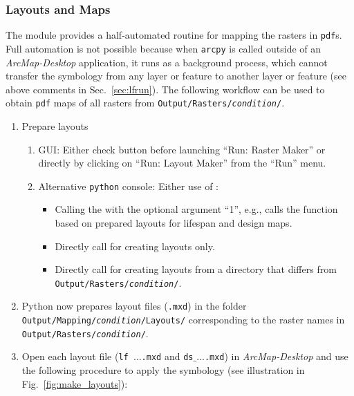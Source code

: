 \subsubsection{Layouts and Maps}\label{sec:outmaps}
The module provides a half-automated routine for mapping the rasters in \texttt{pdf}s. Full automation is not possible because when \texttt{arcpy} is called outside of an \textit{ArcMap-Desktop} application, it runs as a background process, which cannot transfer the symbology from any layer or feature to another layer or feature (see above comments in Sec.~\ref{sec:lfrun}). The following workflow can be used to obtain \texttt{pdf} maps of all rasters from \texttt{Output/Rasters/\textit{condition}/}.
\begin{enumerate}
	\item Prepare layouts
	\begin{enumerate}
	\item GUI: Either check button before launching ``Run: Raster Maker'' or directly by clicking on ``Run: Layout Maker'' from the ``Run'' menu.
	\item Alternative \texttt{python} console: Either use  of :
	\begin{itemize}
		\item Calling the  with the optional argument ``1'', e.g.,  calls the function  based on prepared layouts for lifespan and design maps.
		\item Directly call  for creating layouts only.
		\item Directly call  for creating layouts from a directory that differs from \texttt{Output/Rasters/\textit{condition}/}.
	\end{itemize}
	\end{enumerate}
	\item Python now prepares layout files (\texttt{.mxd}) in the folder \texttt{Output/Mapping/\textit{condition}/Layouts/} corresponding to the raster names in \texttt{Output/Rasters/\textit{condition}/}.
	\item Open each layout file (\texttt{lf{\myUnderscore} $\ldots$.mxd} and \texttt{ds$\_ \ldots$.mxd}) in \textit{ArcMap-Desktop} and use the following procedure to apply the symbology (see illustration in Fig.~\ref{fig:make_layouts}):

\end{enumerate}
